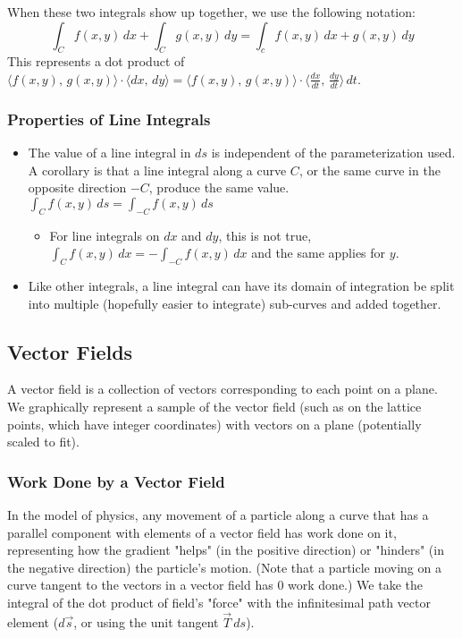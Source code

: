 \documentclass{article}
\newcommand{\vect}[1]{\ensuremath{\overrightarrow{#1}}}
\begin{document}
When these two integrals show up together, we use the following notation:
$$\int_Cf(x,y)\,dx+\int_Cg(x,y)\,dy=\int_cf(x,y)\,dx+g(x,y)\,dy$$
This represents a dot product of $\langle f(x,y),\,g(x,y)\rangle\cdot\langle dx,\,dy\rangle=\langle f(x,y),\,g(x,y)\rangle\cdot\langle \frac{dx}{dt},\,\frac{dy}{dt}\rangle\,dt$.
\subsubsection{Properties of Line Integrals}
\begin{itemize}
    \item The value of a line integral in $ds$ is independent of the parameterization used. A corollary is that a line integral along a curve $C$, or the same curve in the opposite direction $-C$, produce the same value. $\int_C f(x,y)\,ds=\int_{-C}f(x,y)\,ds$
    \begin{itemize}
        \item For line integrals on $dx$ and $dy$, this is not true, $\int_Cf(x,y)\,dx=-\int_{-C}f(x,y)\,dx$ and the same applies for $y$.
    \end{itemize}
    \item Like other integrals, a line integral can have its domain of integration be split into multiple (hopefully easier to integrate) sub-curves and added together.
\end{itemize}

\subsection{Vector Fields}
A vector field is a collection of vectors corresponding to each point on a plane. We graphically represent a sample of the vector field (such as on the lattice points, which have integer coordinates) with vectors on a plane (potentially scaled to fit).
\subsubsection{Work Done by a Vector Field}
In the model of physics, any movement of a particle along a curve that has a parallel component with elements of a vector field has work done on it, representing how the gradient "helps" (in the positive direction) or "hinders" (in the negative direction) the particle's motion. (Note that a particle moving on a curve tangent to the vectors in a vector field has 0 work done.) We take the integral of the dot product of field's "force" with the infinitesimal path vector element ($d\vect{s}$, or using the unit tangent $\vect{T}\,ds$).
\end{document}
